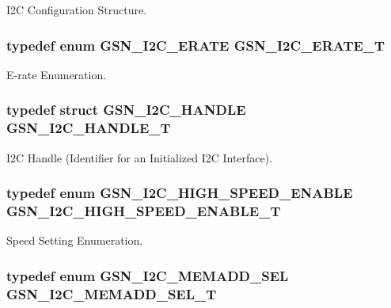 I2C Configuration Structure. 

\hypertarget{a00649_gad834947ae5685696ffea0ecec904b16e}{
\subsubsection[{GSN\_\-I2C\_\-ERATE\_\-T}]{\setlength{\rightskip}{0pt plus 5cm}typedef enum {\bf GSN\_\-I2C\_\-ERATE}  {\bf GSN\_\-I2C\_\-ERATE\_\-T}}}
\label{a00649_gad834947ae5685696ffea0ecec904b16e}


E-\/rate Enumeration. 

\hypertarget{a00649_ga0a305c61b3066326aa4867e75fdfdbf1}{
\subsubsection[{GSN\_\-I2C\_\-HANDLE\_\-T}]{\setlength{\rightskip}{0pt plus 5cm}typedef struct {\bf GSN\_\-I2C\_\-HANDLE} {\bf GSN\_\-I2C\_\-HANDLE\_\-T}}}
\label{a00649_ga0a305c61b3066326aa4867e75fdfdbf1}


I2C Handle (Identifier for an Initialized I2C Interface). 

\hypertarget{a00649_ga78dfa46a936df5bba07b4ba66cdfca62}{
\subsubsection[{GSN\_\-I2C\_\-HIGH\_\-SPEED\_\-ENABLE\_\-T}]{\setlength{\rightskip}{0pt plus 5cm}typedef enum {\bf GSN\_\-I2C\_\-HIGH\_\-SPEED\_\-ENABLE}  {\bf GSN\_\-I2C\_\-HIGH\_\-SPEED\_\-ENABLE\_\-T}}}
\label{a00649_ga78dfa46a936df5bba07b4ba66cdfca62}


Speed Setting Enumeration. 

\hypertarget{a00649_ga3c8e92172b940c58950060ddbccee36d}{
\subsubsection[{GSN\_\-I2C\_\-MEMADD\_\-SEL\_\-T}]{\setlength{\rightskip}{0pt plus 5cm}typedef enum {\bf GSN\_\-I2C\_\-MEMADD\_\-SEL}  {\bf GSN\_\-I2C\_\-MEMADD\_\-SEL\_\-T}}}
\label{a00649_ga3c8e92172b940c58950060ddbccee36d}


